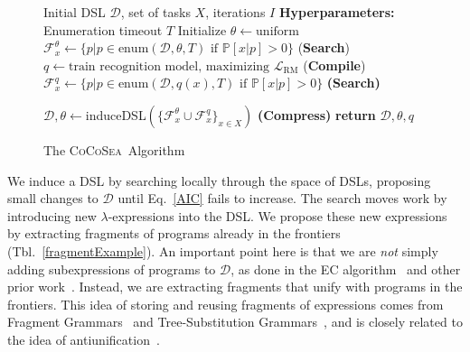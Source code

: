 \documentclass{article}
\newcommand{\system}{\textsc{CoCoSea}~}
\newcommand{\probability}{\mathds{P}} %
\begin{document}
\begin{figure}
  \begin{minipage}{0.6\textwidth}    
    \begin{algorithm}[H]
      \caption{The \system Algorithm}
      \label{mainAlgorithm}
      \begin{algorithmic}
         Initial DSL $\mathcal{D}$, set of tasks $X$, iterations $I$
        \STATE \textbf{Hyperparameters:} Enumeration timeout $T$
        \STATE Initialize $\theta\gets \text{uniform}$ %
        \STATE  $\mathcal{F}^{\theta}_x\gets \{p| p\in
        \text{enum}(\mathcal{D},\theta,T)\text{ if }\probability[x|p] > 0\}$
        \footnotesize{\hspace{0.1cm}(\textbf{Search})}
        \STATE $q\gets \text{train recognition model, maximizing }\mathcal{L}_{\text{RM}}$ \hspace{0.2cm}(\footnotesize{\textbf{Compile}})
        \STATE  $\mathcal{F}^{q}_x\gets\{p|p\in
        \text{enum}(\mathcal{D},q(x),T)\text{ if }\probability[x|p] > 0\}$
        \footnotesize{\hspace{0.15cm}\textbf{(Search)}}
        
        \STATE $\mathcal{D},\theta\gets $induceDSL$(\{\mathcal{F}^{\theta}_x\cup\mathcal{F}^{q}_x\}_{x\in X})$  \hspace{1.1cm} \footnotesize{\textbf{(Compress)}}
        \ENDFOR
        \STATE \textbf{return} $\mathcal{D},\theta,q$
      \end{algorithmic}
    \end{algorithm}
  \end{minipage}
\end{figure}%

We induce a DSL by searching locally through the space of DSLs,
proposing small changes to $\mathcal{D}$ until Eq.~\ref{AIC} fails to increase.
The search moves work by introducing new
$\lambda$-expressions into the DSL.
We propose these new expressions by extracting fragments of
programs already in the frontiers (Tbl.~\ref{fragmentExample}).
An important point here is that we are \emph{not} simply adding
subexpressions of programs to $\mathcal{D}$, as done in the EC algorithm~\cite{Dechter:2013:BLV:2540128.2540316} and other prior work~\cite{DBLP:conf/ecai/LinDETM14}.  Instead, we are
extracting fragments that unify with programs in the frontiers.  This
idea of storing and reusing fragments of expressions comes from
Fragment Grammars~\cite{tim} and Tree-Substitution
Grammars~\cite{cohn2010inducing}, and is closely related to the idea
of antiunification~\cite{henderson2013cumulative}.
\end{document}
